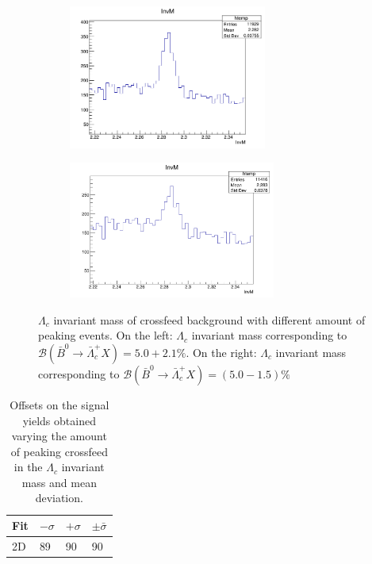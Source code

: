 \begin{figure}[H]
  \begin{subfigure}{7cm}
    \centering\includegraphics[width=6.5cm]{04-chargedCorrBtoLambda/figs/Plus.png}
   
    \label{fig:neutralCrossfeedInvMpeakPlus}
  \end{subfigure}
  \begin{subfigure}{7.2cm}
    \centering\includegraphics[width=6.8cm]{04-chargedCorrBtoLambda/figs/Minus.png}
    \label{fig:neutralCrossfeedInvMpeakMinus}
  \end{subfigure}
\caption{$\Lambda_c$ invariant mass of crossfeed background with different amount of peaking events. On the left:  $\Lambda_c$ invariant mass corresponding to $\mathcal{B}(\bar{B}^0 \rightarrow \bar{\Lambda}_c^+ X) = 5.0 + 2.1\%$.
 On the right: $\Lambda_c$ invariant mass corresponding to $\mathcal{B}(\bar{B}^0 \rightarrow \bar{\Lambda}_c^+ X) = (5.0 -1.5)\%$ }
\end{figure} 

\vspace{0.25 cm}
\begin{table}[H]
\begin{tabular}{ |p{2.5cm}||p{2cm}| p{2cm}|  p{2cm}|}
\hline
    Fit    &  $- \sigma$ &  $+ \sigma$ & $ \pm \bar{\sigma}$\\
 \hline
 2D        &     89  & 90  & 90 \\
  \hline
\end{tabular}
\caption{Offsets on the signal yields obtained varying the amount of peaking crossfeed in the $\Lambda_c$ invariant mass and mean deviation.}
\end{table}
 \vspace{0.25 cm}

